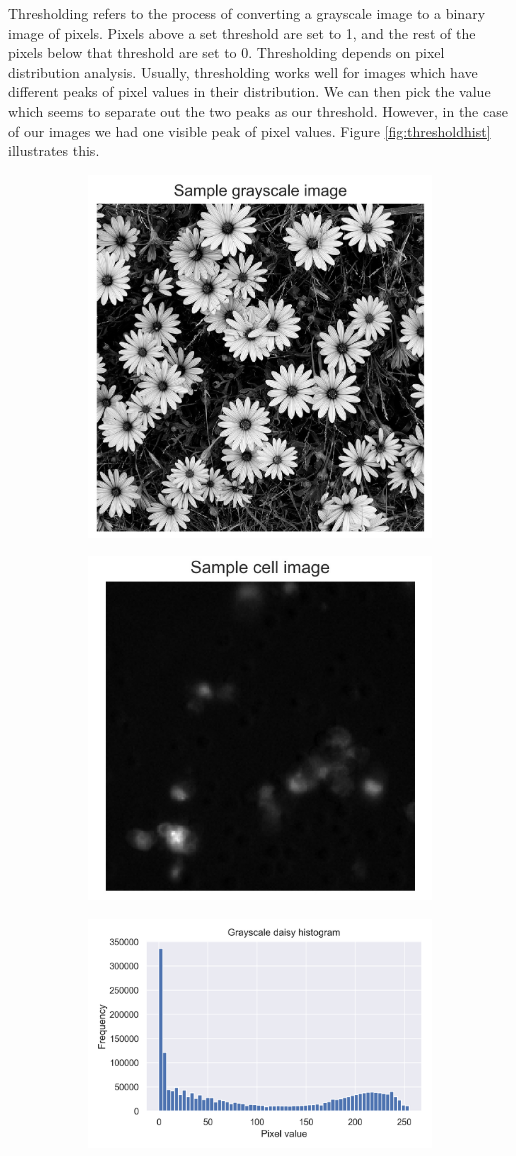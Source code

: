 Thresholding refers to the process of converting a grayscale image to a binary image of pixels. Pixels above a set threshold are set to 1, and the rest of the pixels below that threshold are set to 0. Thresholding depends on pixel distribution analysis. Usually, thresholding works well for images which have different peaks of pixel values in their distribution. We can then pick the value which seems to separate out the two peaks as our threshold. However, in the case of our images we had one visible peak of pixel values. Figure \ref{fig:thresholdhist} illustrates this.

\begin{figure}[h]
    \centering
    \begin{subfigure}{0.45\textwidth}
        \centering
        \includegraphics[width=.5\textwidth]{dissertation/figures/sample_grayscale.jpg}
    \end{subfigure}
    \begin{subfigure}{0.45\textwidth}
        \centering
        \includegraphics[width=.5\textwidth]{dissertation/figures/sample_cell.jpg}
    \end{subfigure}
    \begin{subfigure}{0.45\textwidth}
        \centering
        \includegraphics[width=.5\textwidth]{dissertation/figures/grayscale_histogram.png}

\end{subfigure}
\end{figure}
